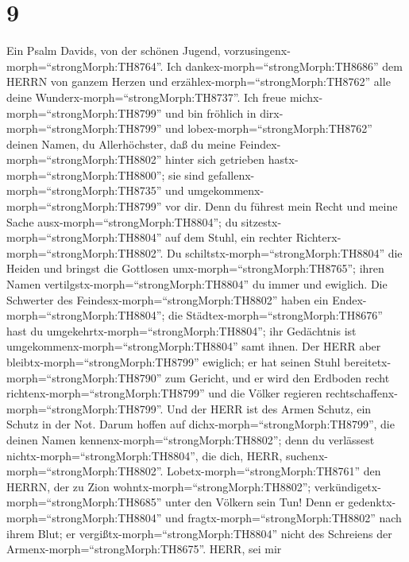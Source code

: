 \hypertarget{section-8}{%
\section{9}\label{section-8}}

 Ein Psalm Davids, von der schönen Jugend,
vorzusingenx-morph=``strongMorph:TH8764''. Ich
dankex-morph=``strongMorph:TH8686'' dem HERRN von ganzem Herzen und
erzählex-morph=``strongMorph:TH8762'' alle deine
Wunderx-morph=``strongMorph:TH8737''.  Ich freue
michx-morph=``strongMorph:TH8799'' und bin fröhlich in
dirx-morph=``strongMorph:TH8799'' und lobex-morph=``strongMorph:TH8762''
deinen Namen, du Allerhöchster,  daß du meine
Feindex-morph=``strongMorph:TH8802'' hinter sich getrieben
hastx-morph=``strongMorph:TH8800''; sie sind
gefallenx-morph=``strongMorph:TH8735'' und
umgekommenx-morph=``strongMorph:TH8799'' vor dir.  Denn du
führest mein Recht und meine Sache ausx-morph=``strongMorph:TH8804''; du
sitzestx-morph=``strongMorph:TH8804'' auf dem Stuhl, ein rechter
Richterx-morph=``strongMorph:TH8802''.  Du
schiltstx-morph=``strongMorph:TH8804'' die Heiden und bringst die
Gottlosen umx-morph=``strongMorph:TH8765''; ihren Namen
vertilgstx-morph=``strongMorph:TH8804'' du immer und ewiglich.
 Die Schwerter des Feindesx-morph=``strongMorph:TH8802''
haben ein Endex-morph=``strongMorph:TH8804''; die
Städtex-morph=``strongMorph:TH8676'' hast du
umgekehrtx-morph=``strongMorph:TH8804''; ihr Gedächtnis ist
umgekommenx-morph=``strongMorph:TH8804'' samt ihnen.  Der
HERR aber bleibtx-morph=``strongMorph:TH8799'' ewiglich; er hat seinen
Stuhl bereitetx-morph=``strongMorph:TH8790'' zum Gericht, 
und er wird den Erdboden recht richtenx-morph=``strongMorph:TH8799'' und
die Völker regieren rechtschaffenx-morph=``strongMorph:TH8799''.
 Und der HERR ist des Armen Schutz, ein Schutz in der Not.
 Darum hoffen auf dichx-morph=``strongMorph:TH8799'', die
deinen Namen kennenx-morph=``strongMorph:TH8802''; denn du verlässest
nichtx-morph=``strongMorph:TH8804'', die dich, HERR,
suchenx-morph=``strongMorph:TH8802''. 
Lobetx-morph=``strongMorph:TH8761'' den HERRN, der zu Zion
wohntx-morph=``strongMorph:TH8802'';
verkündigetx-morph=``strongMorph:TH8685'' unter den Völkern sein Tun!
 Denn er gedenktx-morph=``strongMorph:TH8804'' und
fragtx-morph=``strongMorph:TH8802'' nach ihrem Blut; er
vergißtx-morph=``strongMorph:TH8804'' nicht des Schreiens der
Armenx-morph=``strongMorph:TH8675''.  HERR, sei mir
